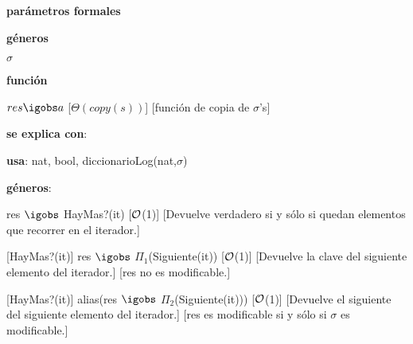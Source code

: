\begin{Interfaz}

	\textbf{parámetros formales}\parindent\\
	\parbox{1.7cm}{\textbf{géneros}} $\sigma$\\
	\parbox[t]{1.7cm}{\textbf{función}}\parbox[t]{\textwidth-2\parindent-1.7cm}{%
	    	{$res \igobs a$}
		[$\Theta(copy(s))$]
		[función de copia de $\sigma$'s]
	}
	
	\textbf{se explica con}: 
	
	\textbf{usa}: nat, bool, diccionarioLog(nat,$\sigma$)
	
	\textbf{géneros}: 
	


	{res $\igobs$ HayMas?(it)}
	[$\mathcal{O}$(1)]
	[Devuelve verdadero si y sólo si quedan elementos que recorrer en el iterador.]
	
	[HayMas?(it)]
	{res $\igobs$ $\Pi_1$(Siguiente(it))}
	[$\mathcal{O}$(1)]
	[Devuelve la clave del siguiente elemento del iterador.]
	[res no es modificable.]
	
	[HayMas?(it)]
	{alias(res $\igobs$ $\Pi_2$(Siguiente(it)))}
	[$\mathcal{O}$(1)]
	[Devuelve el siguiente del siguiente elemento del iterador.]
	[res es modificable si y sólo si $\sigma$ es modificable.]

\end{Interfaz}	

